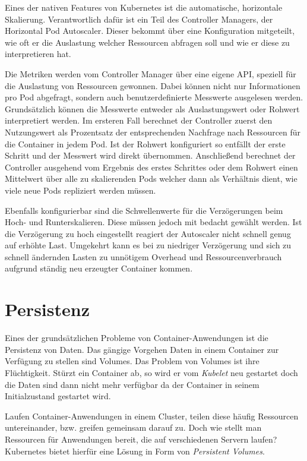 Eines der nativen Features von Kubernetes ist die automatische, horizontale Skalierung.
Verantwortlich dafür ist ein Teil des Controller Managers, der \glqq{}Horizontal Pod Autoscaler\grqq{}.
Dieser bekommt über eine Konfiguration mitgeteilt, wie oft er die Auslastung welcher Ressourcen abfragen soll und wie er diese zu interpretieren hat.

Die Metriken werden vom Controller Manager über eine eigene API, speziell für die Auslastung von Ressourcen gewonnen.
Dabei können nicht nur Informationen pro Pod abgefragt, sondern auch benutzerdefinierte Messwerte ausgelesen werden.
Grundsätzlich können die Messwerte entweder als Auslastungswert oder Rohwert interpretiert werden.
Im ersteren Fall berechnet der Controller zuerst den Nutzungswert als Prozentsatz der entsprechenden Nachfrage nach Ressourcen für die Container in jedem Pod.
Ist der Rohwert konfiguriert so entfällt der erste Schritt und der Messwert wird direkt übernommen.
Anschließend berechnet der Controller ausgehend vom Ergebnis des erstes Schrittes oder dem Rohwert einen Mittelwert über alle zu skalierenden Pods welcher dann als Verhältnis dient, wie viele neue Pods repliziert werden müssen.

Ebenfalls konfigurierbar sind die Schwellenwerte für die Verzögerungen beim Hoch- und Runterskalieren.
Diese müssen jedoch mit bedacht gewählt werden.
Ist die Verzögerung zu hoch eingestellt reagiert der Autoscaler nicht schnell genug auf erhöhte Last.
Umgekehrt kann es bei zu niedriger Verzögerung und sich zu schnell ändernden Lasten zu unnötigem Overhead und Ressourcenverbrauch aufgrund ständig neu erzeugter Container kommen.

\section{Persistenz}

Eines der grundsätzlichen Probleme von Container-Anwendungen ist die Persistenz von Daten.
Das gängige Vorgehen Daten in einem Container zur Verfügung zu stellen sind Volumes.
Das Problem von Volumes ist ihre Flüchtigkeit.
Stürzt ein Container ab, so wird er vom \textit{Kubelet} neu gestartet doch die Daten sind dann nicht mehr verfügbar da der Container in seinem Initialzustand gestartet wird.

Laufen Container-Anwendungen in einem Cluster, teilen diese häufig Ressourcen untereinander, bzw. greifen gemeinsam darauf zu.
Doch wie stellt man Ressourcen für Anwendungen bereit, die auf verschiedenen Servern laufen?
Kubernetes bietet hierfür eine Lösung in Form von \textit{Persistent Volumes}.

